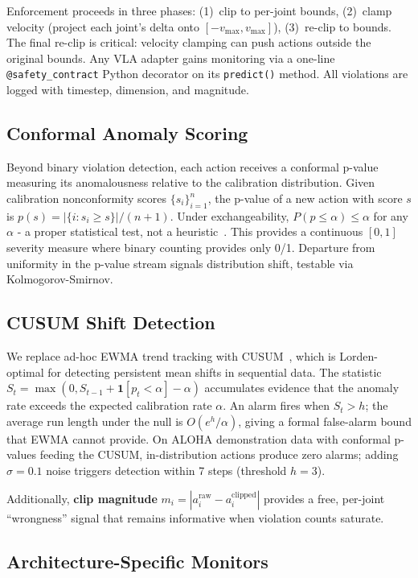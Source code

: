\documentclass[conference]{IEEEtran}
\begin{document}
Enforcement proceeds in three phases: (1)~clip to per-joint bounds, (2)~clamp velocity (project each joint's delta onto $[-v_{\max}, v_{\max}]$), (3)~re-clip to bounds.
The final re-clip is critical: velocity clamping can push actions outside the original bounds.
Any VLA adapter gains monitoring via a one-line \texttt{@safety\_contract} Python decorator on its \texttt{predict()} method.
All violations are logged with timestep, dimension, and magnitude.

\subsection{Conformal Anomaly Scoring}
\label{sec:monitoring}

Beyond binary violation detection, each action receives a conformal p-value measuring its anomalousness relative to the calibration distribution.
Given calibration nonconformity scores $\{s_i\}_{i=1}^n$, the p-value of a new action with score $s$ is $p(s) = |\{i : s_i \ge s\}| / (n+1)$.
Under exchangeability, $P(p \le \alpha) \le \alpha$ for any $\alpha$ - a proper statistical test, not a heuristic~\cite{vovk2005}.
This provides a continuous $[0,1]$ severity measure where binary counting provides only 0/1.
Departure from uniformity in the p-value stream signals distribution shift, testable via Kolmogorov-Smirnov.

\subsection{CUSUM Shift Detection}

We replace ad-hoc EWMA trend tracking with CUSUM~\cite{page1954}, which is Lorden-optimal for detecting persistent mean shifts in sequential data.
The statistic $S_t = \max(0, S_{t-1} + \mathbf{1}[p_t < \alpha] - \alpha)$ accumulates evidence that the anomaly rate exceeds the expected calibration rate $\alpha$.
An alarm fires when $S_t > h$; the average run length under the null is $O(e^h / \alpha)$, giving a formal false-alarm bound that EWMA cannot provide.
On ALOHA demonstration data with conformal p-values feeding the CUSUM, in-distribution actions produce zero alarms; adding $\sigma{=}0.1$ noise triggers detection within 7 steps (threshold $h{=}3$).

Additionally, \textbf{clip magnitude} $m_i = |a_i^{\text{raw}} - a_i^{\text{clipped}}|$ provides a free, per-joint ``wrongness'' signal that remains informative when violation counts saturate.

\subsection{Architecture-Specific Monitors}
\label{sec:health}
\end{document}
